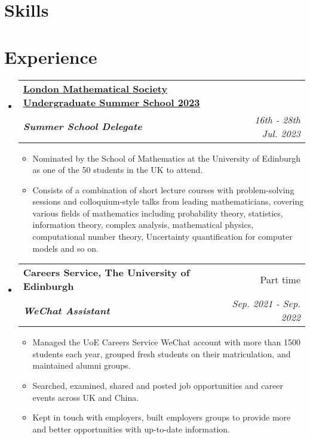 \documentclass[12pt, a4paper]{article}
\makeatletter
\newcommand{\resumeSection}[1]{
    \section*{#1}
}
\newcommand{\resumeSectionItm}[4]{
\item
    \begin{tabular*}{0.96\textwidth}{@{}l@{\extracolsep{\fill}}r@{}}
        \textbf{#1} & #2 \\
        \textit{\textbf{#3}} & \textit{#4}
    \end{tabular*}
}
\newcommand{\resumeSectionSubItm}[2]{
\item
    \textbf{\parbox[t]{4.7cm}{#1\hfill}}\parbox[t]{12.5cm}{#2}\vspace{-2mm}
}
\newcommand{\resumeSectionSubItmI}[1]{
\item {#1}\vspace{-2mm}
}
\makeatother
\begin{document}
\resumeSection{Skills}
\vspace{-1mm}


\resumeSection{Experience}
\begin{itemize}[leftmargin=*]
    \resumeSectionItm{\href{https://www.lms.ac.uk/events/lms-summer-schools}
    {London Mathematical Society Undergraduate Summer School 2023}}
    {}{Summer School Delegate}{16th - 28th Jul. 2023}\vspace{-2mm}
    \begin{itemize}[leftmargin=*]
        \setlength\itemsep{1.5mm}
        \resumeSectionSubItmI{Nominated by the School of Mathematics at the
            University of Edinburgh as one of the 50 students in the UK to
        attend.}
        \resumeSectionSubItmI{Consists of a combination of
            short lecture courses with problem-solving sessions and
            colloquium-style talks from leading mathematicians, covering various
            fields of mathematics including probability theory, statistics,
            information theory, complex analysis, mathematical physics,
            computational number theory, Uncertainty quantification for computer
        models and so on.}
    \end{itemize}\vspace{0mm}
    \resumeSectionItm
    {Careers Service, The University of Edinburgh}{Part time}
    {WeChat Assistant}{Sep. 2021 - Sep. 2022}\vspace{-2mm}
    \begin{itemize}[leftmargin=*]
        \setlength\itemsep{1.5mm}
        \resumeSectionSubItmI{Managed the UoE Careers Service WeChat account
            with more than 1500 students each year, grouped fresh students on
            their matriculation, and maintained alumni groups.}
        \resumeSectionSubItmI{Searched, examined, shared and posted job
        opportunities and career events across UK and China.}
        \resumeSectionSubItmI{Kept in touch with employers, built employers
            groups to provide more and better opportunities with up-to-date
        information.}
    \end{itemize}
\end{itemize}
\vspace{-2mm}
\end{document}
